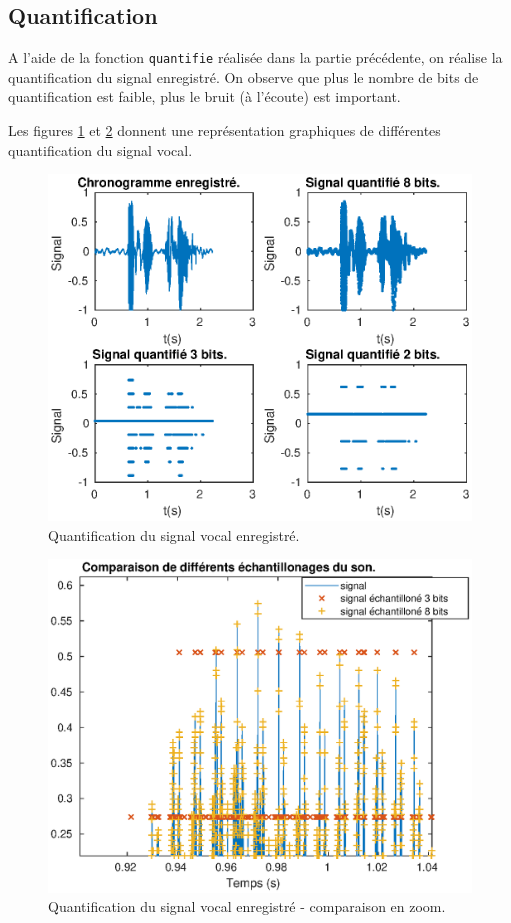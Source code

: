 \documentclass[french]{article}
\begin{document}
\subsection{ Quantification}

A l'aide de la fonction \verb`quantifie` réalisée dans la partie précédente, on réalise la quantification du signal enregistré. On observe que plus le nombre de bits de quantification est faible, plus le bruit (à l'écoute) est important.

Les figures \ref{sonQuantifie1} et \ref{sonQuantifie2} donnent une représentation graphiques de différentes quantification du signal vocal.

\begin{figure}[!h]
\centering
\includegraphics[height=0.45\textheight]{images/sonQuantifie2.eps}
\caption{Quantification du signal vocal enregistré.}
\label{sonQuantifie1}
\end{figure}

\begin{figure}[!h]
\centering
\includegraphics[height=0.45\textheight]{images/sonQuantifie.eps}
\caption{Quantification du signal vocal enregistré - comparaison en zoom.}
\label{sonQuantifie2}
\end{figure}
\end{document}
